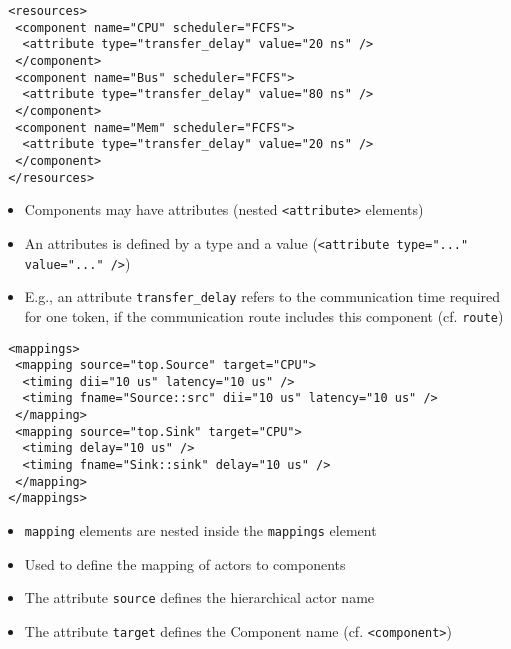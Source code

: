 \begin{frame}[fragile=singleslide]
\begin{lstlisting}
 <resources>
  <component name="CPU" scheduler="FCFS">
   <attribute type="transfer_delay" value="20 ns" />
  </component>
  <component name="Bus" scheduler="FCFS">
   <attribute type="transfer_delay" value="80 ns" />
  </component>
  <component name="Mem" scheduler="FCFS">
   <attribute type="transfer_delay" value="20 ns" />
  </component>
 </resources>
\end{lstlisting}
\begin{itemize}
\item Components may have attributes (nested \lstinline!<attribute>! elements)
\item An attributes is defined by a type and a value (\lstinline!<attribute type="..." value="..." />!)
\item E.g., an attribute \lstinline!transfer_delay! refers to the communication time required for one token, if the communication route includes this component (cf. \lstinline!route!)
\end{itemize}
\end{frame}


\begin{frame}[fragile=singleslide]
\begin{lstlisting}
 <mappings>
  <mapping source="top.Source" target="CPU">
   <timing dii="10 us" latency="10 us" />
   <timing fname="Source::src" dii="10 us" latency="10 us" />
  </mapping>
  <mapping source="top.Sink" target="CPU">
   <timing delay="10 us" />
   <timing fname="Sink::sink" delay="10 us" />
  </mapping>
 </mappings>
\end{lstlisting}
\begin{itemize}
\item \lstinline!mapping! elements are nested inside the \lstinline!mappings! element
\item Used to define the mapping of actors to components
\item The attribute \lstinline!source! defines the hierarchical actor name
\item The attribute \lstinline!target! defines the Component name (cf. \lstinline!<component>!)
\end{itemize}
\end{frame}



